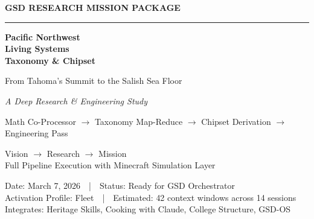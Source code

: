 \documentclass[11pt,letterpaper]{article}
\begin{document}
\thispagestyle{empty}
\begin{center}
\vspace*{2cm}

{\small\sffamily\textcolor{primary}{\textbf{GSD RESEARCH MISSION PACKAGE}}}

\vspace{0.3cm}
\textcolor{bordergray}{\rule{8cm}{0.4pt}}

\vspace{1.2cm}
{\fontsize{26}{32}\selectfont\bfseries\sffamily\textcolor{primary}{Pacific Northwest\\[0.3em]Living Systems\\[0.3em]Taxonomy \& Chipset}}

\vspace{0.6cm}
{\Large\sffamily\textcolor{secondary}{From Tahoma's Summit to the Salish Sea Floor}}

\vspace{0.4cm}
{\large\sffamily\itshape\textcolor{tertiary}{A Deep Research \& Engineering Study}}

\vspace{0.4cm}
{\normalsize\sffamily\textcolor{subtlegray}{Math Co-Processor $\rightarrow$ Taxonomy Map-Reduce $\rightarrow$ Chipset Derivation $\rightarrow$ Engineering Pass}}

\vspace{2cm}
{\sffamily\textcolor{accent}{Vision $\rightarrow$ Research $\rightarrow$ Mission}}\\[0.3em]
{\small\sffamily\textcolor{accent}{Full Pipeline Execution with Minecraft Simulation Layer}}

\vspace{2cm}
{\small\sffamily\textcolor{subtlegray}{Date: March 7, 2026~~|~~Status: Ready for GSD Orchestrator}}\\[0.3em]
{\small\sffamily\textcolor{subtlegray}{Activation Profile: Fleet~~|~~Estimated: 42 context windows across 14 sessions}}\\[0.3em]
{\small\sffamily\textcolor{subtlegray}{Integrates: Heritage Skills, Cooking with Claude, College Structure, GSD-OS}}
\end{center}
\newpage

\tableofcontents
\newpage
\end{document}
